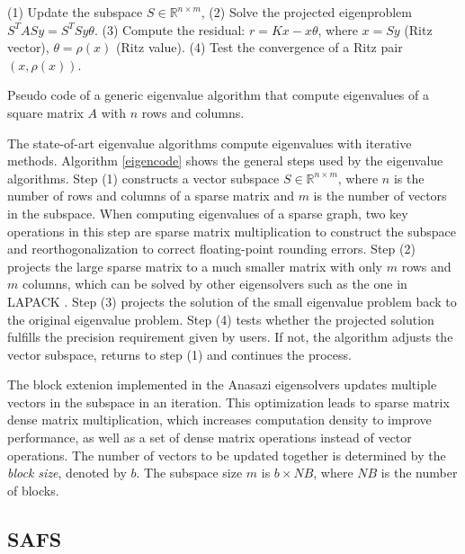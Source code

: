 \begin{algorithm}
	\begin{algorithmic}[1]
		\State (1) Update the subspace $S \in \mathbb{R}^{n \times m}$,
		\State (2) Solve the projected eigenproblem $S^TASy = S^TSy\theta$.
		\State (3) Compute the residual: $r = Kx - x\theta$, where
		\State\hspace{\algorithmicindent} $x = Sy$ (Ritz vector), $\theta = \rho(x)$ (Ritz value).
		\State (4) Test the convergence of a Ritz pair $(x, \rho(x))$.
		\EndFor
	\end{algorithmic}
	\caption{Pseudo code of a generic eigenvalue algorithm that compute eigenvalues
	of a square matrix $A$ with $n$ rows and columns.}
	\label{eigencode}
\end{algorithm}

The state-of-art eigenvalue algorithms compute eigenvalues with iterative
methods. Algorithm \ref{eigencode} shows the general steps used by the eigenvalue
algorithms.
Step (1) constructs a vector subspace $S \in \mathbb{R}^{n \times m}$, where
$n$ is the number of rows and columns of a sparse matrix and $m$ is the number
of vectors in the subspace. When computing eigenvalues of a sparse graph,
two key operations in this step are sparse matrix multiplication to construct
the subspace and reorthogonalization to correct floating-point rounding errors.
Step (2) projects the large sparse matrix to a much smaller matrix with only
$m$ rows and $m$ columns, which can be solved by other eigensolvers such as
the one in LAPACK \cite{lapack}. Step (3) projects the solution of the small
eigenvalue problem back to the original eigenvalue problem. Step (4) tests
whether the projected solution fulfills the precision requirement given by
users. If not, the algorithm adjusts the vector subspace, returns to step (1)
and continues the process.

The block extenion implemented in the Anasazi eigensolvers updates multiple
vectors in the subspace in an iteration. This optimization leads to sparse
matrix dense matrix multiplication, which increases computation density to
improve performance, as well as a set of dense matrix operations instead of
vector operations. The number of vectors to be updated together is determined
by the \textit{block size}, denoted by $b$. The subspace size $m$
is $b \times NB$, where $NB$ is the number of blocks.

\subsection{SAFS}

